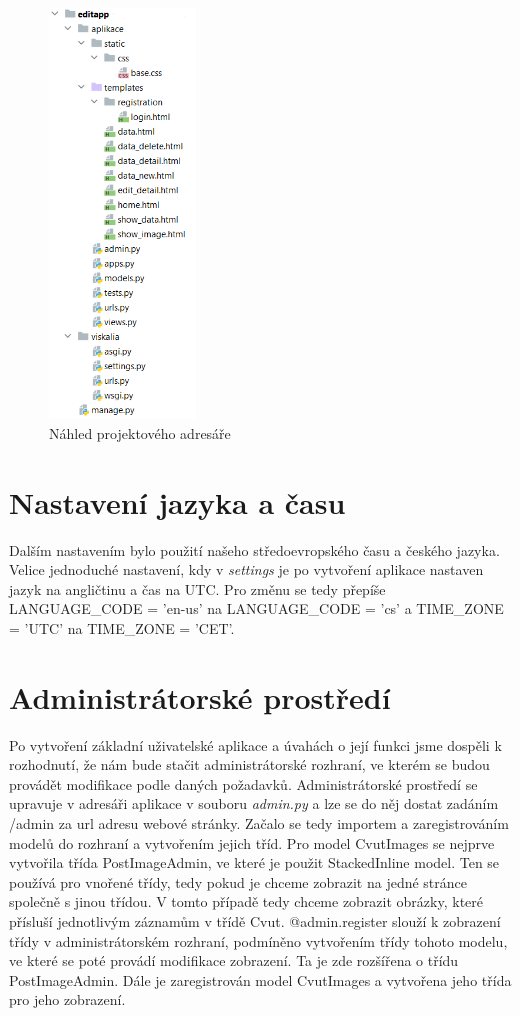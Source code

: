 \begin{figure}[H] \centering
    \includegraphics[width=110pt]{./pictures/7-nahled-adresare.PNG}
    \caption[Náhled projektového adresáře]{Náhled projektového adresáře}
	\label{fig:Náhled projektového adresáře}              
\end{figure}

\section{Nastavení jazyka a času}

Dalším nastavením bylo použití našeho středoevropského času a českého
jazyka. Velice jednoduché nastavení, kdy v \emph{settings} je po
vytvoření aplikace nastaven jazyk na angličtinu a čas na UTC. Pro
změnu se tedy přepíše LANGUAGE\_CODE = 'en-us' na
LANGUAGE\_CODE = 'cs' a TIME\_ZONE = 'UTC' na
TIME\_ZONE = 'CET'.

\newpage

\section{Administrátorské prostředí}

Po vytvoření základní uživatelské aplikace a úvahách o její funkci jsme dospěli k rozhodnutí, že nám bude stačit administrátorské rozhraní, ve kterém se budou provádět modifikace podle daných požadavků. Administrátorské prostředí se upravuje v adresáři aplikace v souboru \emph{admin.py} a lze se do něj dostat zadáním /admin za url adresu webové stránky. Začalo se tedy importem a zaregistrováním modelů do rozhraní a vytvořením jejich tříd. Pro model CvutImages se nejprve vytvořila třída PostImageAdmin, ve které je použit StackedInline model. Ten se používá pro vnořené třídy, tedy pokud je chceme zobrazit na jedné stránce společně s jinou třídou. V tomto případě tedy chceme zobrazit obrázky, které přísluší jednotlivým záznamům v třídě Cvut. @admin.register slouží k zobrazení třídy v administrátorském rozhraní, podmíněno vytvořením třídy tohoto modelu, ve které se poté provádí modifikace zobrazení. Ta je zde rozšířena o třídu PostImageAdmin. Dále je zaregistrován model CvutImages a vytvořena jeho třída pro jeho zobrazení.


